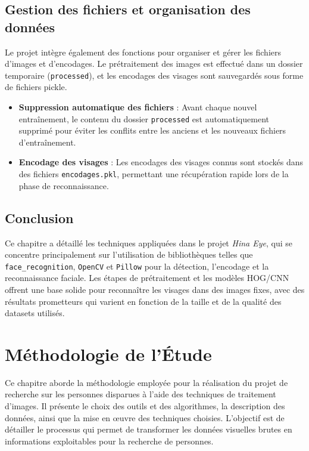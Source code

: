 \documentclass[a4paper,12pt]{report}
\begin{document}
\section{Gestion des fichiers et organisation des données}
Le projet intègre également des fonctions pour organiser et gérer les fichiers d'images et d'encodages. Le prétraitement des images est effectué dans un dossier temporaire (\texttt{processed}), et les encodages des visages sont sauvegardés sous forme de fichiers pickle.

\begin{itemize}
    \item \textbf{Suppression automatique des fichiers} : Avant chaque nouvel entraînement, le contenu du dossier \texttt{processed} est automatiquement supprimé pour éviter les conflits entre les anciens et les nouveaux fichiers d'entraînement.
    \item \textbf{Encodage des visages} : Les encodages des visages connus sont stockés dans des fichiers \texttt{encodages.pkl}, permettant une récupération rapide lors de la phase de reconnaissance.
\end{itemize}

\section{Conclusion}
Ce chapitre a détaillé les techniques appliquées dans le projet \textit{Hina Eye}, qui se concentre principalement sur l'utilisation de bibliothèques telles que \texttt{face\_recognition}, \texttt{OpenCV} et \texttt{Pillow} pour la détection, l'encodage et la reconnaissance faciale. Les étapes de prétraitement et les modèles HOG/CNN offrent une base solide pour reconnaître les visages dans des images fixes, avec des résultats prometteurs qui varient en fonction de la taille et de la qualité des datasets utilisés.

\chapter{Méthodologie de l’Étude}

Ce chapitre aborde la méthodologie employée pour la réalisation du projet de recherche sur les personnes disparues à l’aide des techniques de traitement d’images. Il présente le choix des outils et des algorithmes, la description des données, ainsi que la mise en œuvre des techniques choisies. L’objectif est de détailler le processus qui permet de transformer les données visuelles brutes en informations exploitables pour la recherche de personnes.
\end{document}
